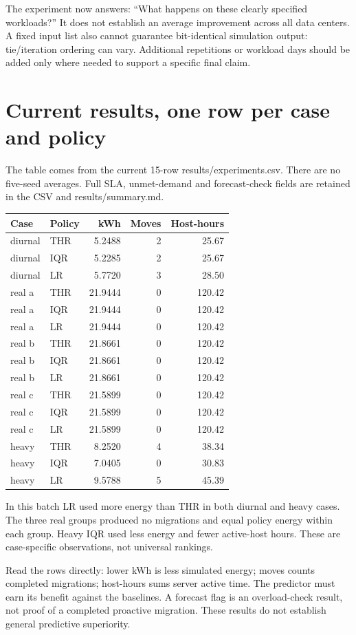 \documentclass[11pt,a4paper]{article}
\begin{document}
The experiment now answers: ``What happens on these clearly specified workloads?'' It does not establish an average improvement across all data centers. A fixed input list also cannot guarantee bit-identical simulation output: tie/iteration ordering can vary. Additional repetitions or workload days should be added only where needed to support a specific final claim.

\section{Current results, one row per case and policy}
The table comes from the current 15-row results/experiments.csv. There are no five-seed averages. Full SLA, unmet-demand and forecast-check fields are retained in the CSV and results/summary.md.
\begin{center}\small\begin{tabular}{llrrr}\toprule Case & Policy & kWh & Moves & Host-hours\\\midrule
diurnal & THR & 5.2488 & 2 & 25.67\\
diurnal & IQR & 5.2285 & 2 & 25.67\\
diurnal & LR & 5.7720 & 3 & 28.50\\
real a & THR & 21.9444 & 0 & 120.42\\
real a & IQR & 21.9444 & 0 & 120.42\\
real a & LR & 21.9444 & 0 & 120.42\\
real b & THR & 21.8661 & 0 & 120.42\\
real b & IQR & 21.8661 & 0 & 120.42\\
real b & LR & 21.8661 & 0 & 120.42\\
real c & THR & 21.5899 & 0 & 120.42\\
real c & IQR & 21.5899 & 0 & 120.42\\
real c & LR & 21.5899 & 0 & 120.42\\
heavy & THR & 8.2520 & 4 & 38.34\\
heavy & IQR & 7.0405 & 0 & 30.83\\
heavy & LR & 9.5788 & 5 & 45.39\\
\bottomrule\end{tabular}\end{center}
In this batch LR used more energy than THR in both diurnal and heavy cases. The three real groups produced no migrations and equal policy energy within each group. Heavy IQR used less energy and fewer active-host hours. These are case-specific observations, not universal rankings.\par Read the rows directly: lower kWh is less simulated energy; moves counts completed migrations; host-hours sums server active time. The predictor must earn its benefit against the baselines. A forecast flag is an overload-check result, not proof of a completed proactive migration. These results do not establish general predictive superiority.
\end{document}
